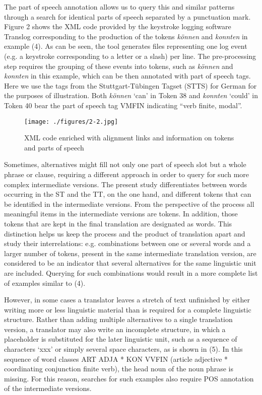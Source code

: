 \documentclass[output=paper]{LSP/langsci}
\begin{document}
The part of speech annotation allows us to query this and similar patterns through a search for identical parts of speech separated by a punctuation mark. 
Figure 2 shows the XML code provided by the keystroke logging software Translog corresponding to the production of the tokens \textit{können} and \textit{konnten} in example (4). As can be seen, the tool generates files representing one log event (e.g. a keystroke corresponding to a letter or a slash) per line. The pre-processing step requires the grouping of these events into tokens, such as \textit{können} and \textit{konnten} in this example, which can be then annotated with part of speech tags. Here we use the tags from the Stuttgart-Tübingen Tagset (STTS) for German \citep{Schiller1999} for the purposes of illustration. Both \textit{können} ‘can' in Token 38 and \textit{konnten} ‘could' in Token 40 bear the part of speech tag VMFIN indicating “verb finite, modal”. 

\begin{figure}
\texttt{[image: ./figures/2-2.jpg]}
\caption{XML code enriched with alignment links and information on tokens and parts of speech}
\end{figure}


Sometimes, alternatives might fill not only one part of speech slot but a whole phrase or clause, requiring a different approach in order to query for such more complex intermediate versions. The present study differentiates between words occurring in the ST and the TT, on the one hand, and different tokens that can be identified in the intermediate versions. From the perspective of the process all meaningful items in the intermediate versions are tokens. In addition, those tokens that are kept in the final translation are designated as words. This distinction helps us keep the process and the product of translation apart and study their interrelations: e.g. combinations between one or several words and a larger number of tokens, present in the same intermediate translation version, are considered to be an indicator that several alternatives for the same linguistic unit are included. Querying for such combinations would result in a more complete list of examples similar to (4).
 
However, in some cases a translator leaves a stretch of text unfinished by either writing more or less linguistic material than is required for a complete linguistic structure. Rather than adding multiple alternatives to a single translation version, a translator may also write an incomplete structure, in which a placeholder is substituted for the later linguistic unit, such as a sequence of characters ‘xxx’ or simply several space characters, as is shown in (5). In this sequence of word classes ART ADJA * KON VVFIN (article adjective * coordinating conjunction finite verb), the head noun of the noun phrase is missing. For this reason, searches for such examples also require POS annotation of the intermediate versions.
\end{document}

